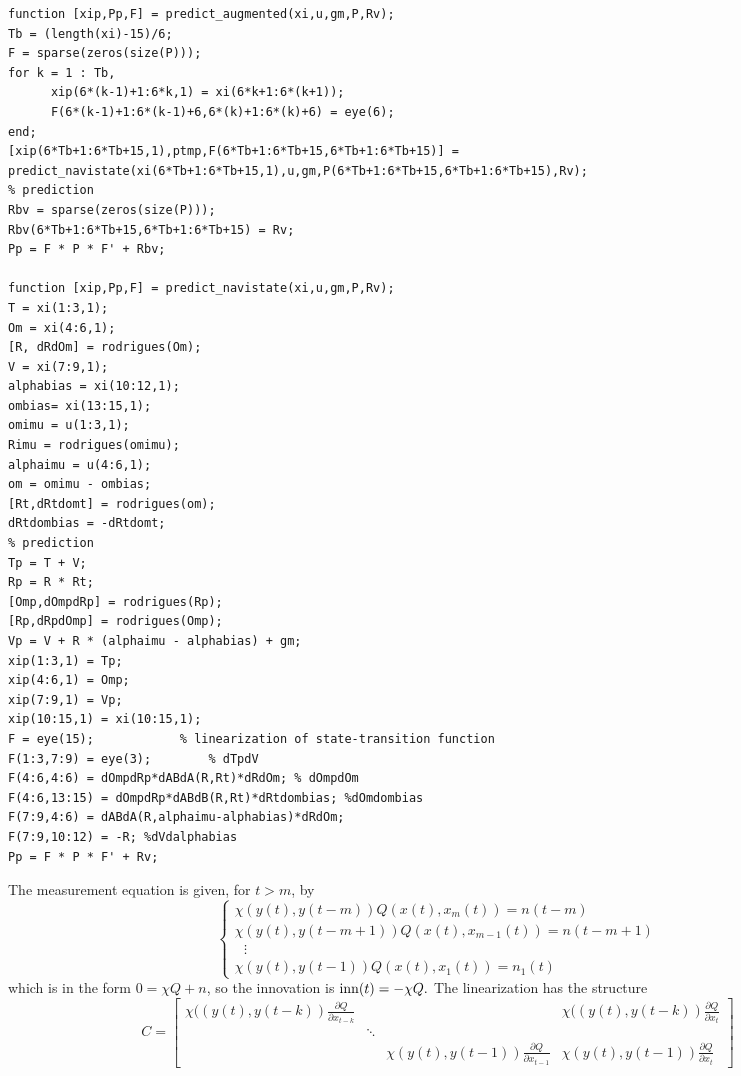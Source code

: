 \documentclass[]{article}
\newcommand{\ba}{\left[ \begin{array}}
\newcommand{\ea}{\end{array} \right]}
\newcommand{\bc}{\begin{cases}}
\newcommand{\ec}{\end{cases}}
\begin{document}
\begin{tiny}
\begin{verbatim}
function [xip,Pp,F] = predict_augmented(xi,u,gm,P,Rv);
Tb = (length(xi)-15)/6;
F = sparse(zeros(size(P)));
for k = 1 : Tb, 
      xip(6*(k-1)+1:6*k,1) = xi(6*k+1:6*(k+1));
      F(6*(k-1)+1:6*(k-1)+6,6*(k)+1:6*(k)+6) = eye(6);
end;
[xip(6*Tb+1:6*Tb+15,1),ptmp,F(6*Tb+1:6*Tb+15,6*Tb+1:6*Tb+15)] = predict_navistate(xi(6*Tb+1:6*Tb+15,1),u,gm,P(6*Tb+1:6*Tb+15,6*Tb+1:6*Tb+15),Rv); 
% prediction
Rbv = sparse(zeros(size(P)));
Rbv(6*Tb+1:6*Tb+15,6*Tb+1:6*Tb+15) = Rv;
Pp = F * P * F' + Rbv;

function [xip,Pp,F] = predict_navistate(xi,u,gm,P,Rv);
T = xi(1:3,1);
Om = xi(4:6,1);
[R, dRdOm] = rodrigues(Om);
V = xi(7:9,1);
alphabias = xi(10:12,1);
ombias= xi(13:15,1);
omimu = u(1:3,1);
Rimu = rodrigues(omimu);
alphaimu = u(4:6,1);
om = omimu - ombias;
[Rt,dRtdomt] = rodrigues(om);
dRtdombias = -dRtdomt; 
% prediction
Tp = T + V; 
Rp = R * Rt;
[Omp,dOmpdRp] = rodrigues(Rp);
[Rp,dRpdOmp] = rodrigues(Omp);
Vp = V + R * (alphaimu - alphabias) + gm;
xip(1:3,1) = Tp;
xip(4:6,1) = Omp;
xip(7:9,1) = Vp; 
xip(10:15,1) = xi(10:15,1);
F = eye(15); 			% linearization of state-transition function
F(1:3,7:9) = eye(3);		% dTpdV
F(4:6,4:6) = dOmpdRp*dABdA(R,Rt)*dRdOm;	% dOmpdOm
F(4:6,13:15) = dOmpdRp*dABdB(R,Rt)*dRtdombias; %dOmdombias
F(7:9,4:6) = dABdA(R,alphaimu-alphabias)*dRdOm;
F(7:9,10:12) = -R; %dVdalphabias 
Pp = F * P * F' + Rv;
\end{verbatim}
\end{tiny}
The measurement equation is given, for $t > m$, by
\begin{equation}
\bc
\chi(y(t),y(t-m))Q(x(t), x_m(t)) = n(t-m) \\
\chi(y(t),y(t-m+1))Q(x(t), x_{m-1}(t)) = n(t-m+1) \\
~~~\vdots \\
\chi(y(t),y(t-1))Q(x(t), x_{1}(t)) = n_1(t) 
\ec
\end{equation}
which is in the form $0 = \chi Q + n$, so the innovation is ${\rm inn}(t) = -\chi Q.$ The linearization has the structure
\begin{equation}
C = \ba{cccc}
\chi((y(t),y(t-k)) \frac{\partial Q}{\partial x_{t-k}} &  & & \chi((y(t),y(t-k)) \frac{\partial Q}{\partial x_t} \\
 & \ddots & & \\
 & & \chi(y(t),y(t-1)) \frac{\partial Q}{\partial x_{t-1}} & \chi(y(t),y(t-1)) \frac{\partial Q}{\partial x_t} %
\ea
\end{equation}
\end{document}
